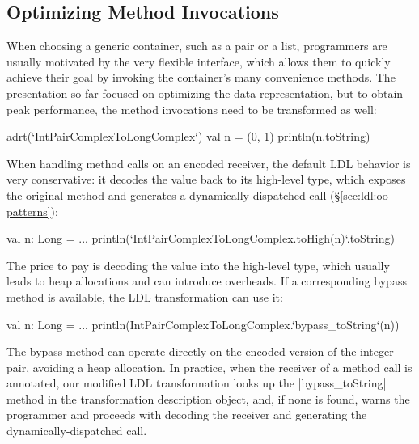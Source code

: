 
\subsection{Optimizing Method Invocations}
\label{sec:ildl:method}

When choosing a generic container, such as a pair or a list, programmers are usually motivated by the very flexible interface, which allows them to quickly achieve their goal by invoking the container's many convenience methods. The presentation so far focused on optimizing the data representation, but to obtain peak performance, the method invocations need to be transformed as well:

\begin{lstlisting-nobreak}
adrt(`IntPairComplexToLongComplex`) {
  val n = (0, 1)
  println(n.toString)
}
\end{lstlisting-nobreak}

When handling method calls on an encoded receiver, the default LDL behavior is very conservative: it decodes the value back to its high-level type, which exposes the original method and generates a dynamically-dispatched call (\S\ref{sec:ldl:oo-patterns}):

\begin{lstlisting-nobreak}
val n: Long = ...
println(`IntPairComplexToLongComplex.toHigh(n)`.toString)
\end{lstlisting-nobreak}

The price to pay is decoding the value into the high-level type, which usually leads to heap allocations and can introduce overheads. If a corresponding bypass method is available, the LDL transformation can use it:

\begin{lstlisting-nobreak}
val n: Long = ...
println(IntPairComplexToLongComplex.`bypass_toString`(n))
\end{lstlisting-nobreak}

The bypass method can operate directly on the encoded version of the integer pair, avoiding a heap allocation. In practice, when the receiver of a method call is annotated, our modified LDL transformation looks up the |bypass_toString| method in the transformation description object, and, if none is found, warns the programmer and proceeds with decoding the receiver and generating the dynamically-dispatched call.


